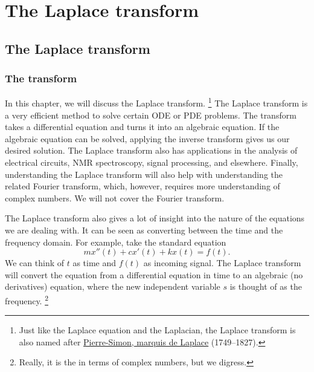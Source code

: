 \chapter{The Laplace transform} \label{LT:chapter}


\section{The Laplace transform}
\label{laplace:section}



\subsection{The transform}

In this chapter, we will discuss the Laplace transform.%
\footnote{Just like the Laplace equation and the Laplacian, the Laplace
transform is also named after 
\href{https://en.wikipedia.org/wiki/Laplace}{Pierre-Simon, marquis de Laplace}
(1749--1827).}
The Laplace transform
is a very efficient method to solve certain ODE or PDE problems.
The transform takes a differential equation and turns it into
an algebraic equation.  If the algebraic equation can be solved, applying the
inverse transform gives us our desired solution.
The Laplace transform also has applications in
the analysis of 
electrical circuits, NMR spectroscopy, signal processing, and elsewhere.
Finally,
understanding the Laplace
transform will also help with understanding the related Fourier transform,
which, however, requires more
understanding of complex numbers.  We will not cover the Fourier transform.

The Laplace transform also gives a lot of insight into the nature of the
equations we are dealing with.  It can be seen as converting between the time
and the frequency domain.  For example, take the standard equation
\begin{equation*}
m x''(t) + c x'(t) + k x(t) = f(t) .
\end{equation*}
We can think of $t$ as time and $f(t)$ as incoming signal.  The Laplace
transform will convert the equation from a differential equation in time to
an algebraic (no derivatives) equation, where the new independent variable
$s$ is thought of as the frequency.%
\footnote{Really, it is the  in terms
of complex numbers, but we digress.}

